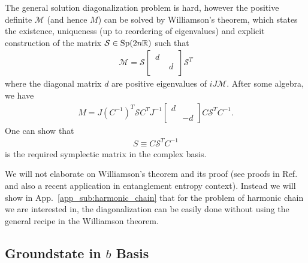 The general solution diagonalization problem is hard\cite{arnold_mathematical_2010}, however the positive definite $\mathcal{M}$ (and hence $M$) can be solved by Williamson's theorem\cite{arnold_mathematical_2010,xiao_theory_2009,pirandola_correlation_2009,gosson_symplectic_2006}, which states the existence, uniqueness (up to reordering of eigenvalues) and explicit construction of the matrix $\mathcal{S}\in {\rm Sp}(2n \mathbb{R}) $ such that 
\begin{equation}\begin{aligned}
\mathcal{M}=\mathcal{S}
\begin{bmatrix}
\, d \, & \\
 & \, d\, \\
\end{bmatrix}
\mathcal{S}^T
\end{aligned}\end{equation}
where the diagonal matrix $d$ are positive eigenvalues of $iJ\mathcal{M}$. After some algebra, we have
\begin{equation}\begin{aligned}
\label{eq:diagonalization_M}
M=J(C^{-1})^T\mathcal{S}C^TJ^{-1}
\begin{bmatrix}
d\\
&-d
\end{bmatrix}
C\mathcal{S}^TC^{-1}.
\end{aligned}\end{equation}
One can show that
\begin{equation*}\begin{aligned}
S\equiv C\mathcal{S}^TC^{-1}
\end{aligned}\end{equation*}
is the required symplectic matrix in the complex basis. 

We will not elaborate on Williamson's theorem and its proof (see proofs in Ref.~ and also a recent application in entanglement entropy context\cite{coser_contour_2017}). Instead we will show in App.~\ref{app_sub:harmonic_chain} that for the problem of harmonic chain we are interested in, the diagonalization can be easily done without using the general recipe in the Williamson theorem. 


\subsection{Groundstate in $b$ Basis}

